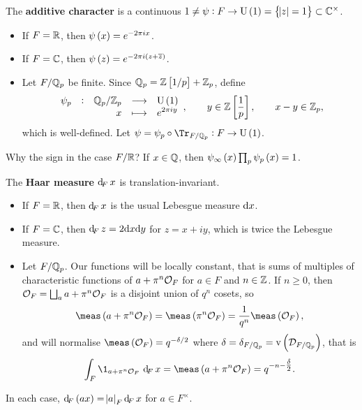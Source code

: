 \begin{definition*}
The \textbf{additive character} is a continuous $ 1 \ne \psi : F \to \U\br{1} = \cbr{\abs{z} = 1} \subset \CC^\times $.
\begin{itemize}
\item If $ F = \mathbb{R} $, then $ \psi\br{x} = e^{-2\pi ix} $.
\item If $ F = \mathbb{C} $, then $ \psi\br{z} = e^{-2\pi i\br{z + \overline{z}}} $.
\item Let $ F / \mathbb{Q}_p $ be finite. Since $ \QQ_p = \ZZ\sbr{1 / p} + \ZZ_p $, define
$$ \function[\psi_p]{\QQ_p / \ZZ_p}{\U\br{1}}{x}{e^{2\pi iy}}, \qquad y \in \ZZ\sbr{\dfrac{1}{p}}, \qquad x - y \in \ZZ_p, $$
which is well-defined. Let $ \psi = \psi_p \circ \Tr_{F / \QQ_p} : F \to \U\br{1} $.
\end{itemize}
\end{definition*}

Why the sign in the case $ F / \mathbb{R} $? If $ x \in \mathbb{Q} $, then $ \psi_\infty\br{x}\prod_p \psi_p\br{x} = 1 $.


\begin{definition*}
The \textbf{Haar measure $ \dF x $} is translation-invariant.
\begin{itemize}
\item If $ F = \mathbb{R} $, then $ \dF x $ is the usual Lebesgue measure $ \mathrm{d} x $.
\item If $ F = \mathbb{C} $, then $ \dF z = 2\d x\d y $ for $ z = x + iy $, which is twice the Lebesgue measure.
\item Let $ F / \mathbb{Q}_p $. Our functions will be locally constant, that is sums of multiples of characteristic functions of $ a + \pi^n\mathcal{O}_F $ for $ a \in F $ and $ n \in \mathbb{Z} $. If $ n \ge 0 $, then $ \mathcal{O}_F = \bigsqcup_a a + \pi^n\mathcal{O}_F $ is a disjoint union of $ q^n $ cosets, so
$$ \meas\br{a + \pi^n\OOO_F} = \meas\br{\pi^n\OOO_F} = \dfrac{1}{q^n}\meas\br{\OOO_F}, $$
and will normalise $ \meas\br{\OOO_F} = q^{-\delta / 2} $ where $ \delta = \delta_{F / \QQ_p} = \v\br{\DDD_{F / \QQ_p}} $, that is
$$ \intF{\1_{a + \pi^n\OOO_F}}{x} = \meas\br{a + \pi^n\OOO_F} = q^{-n - \tfrac{\delta}{2}}. $$
\end{itemize}
\end{definition*}

In each case, $ \dF\br{ax} = \abs{a}_F\dF x $ for $ a \in F^\times $.

\pagebreak

